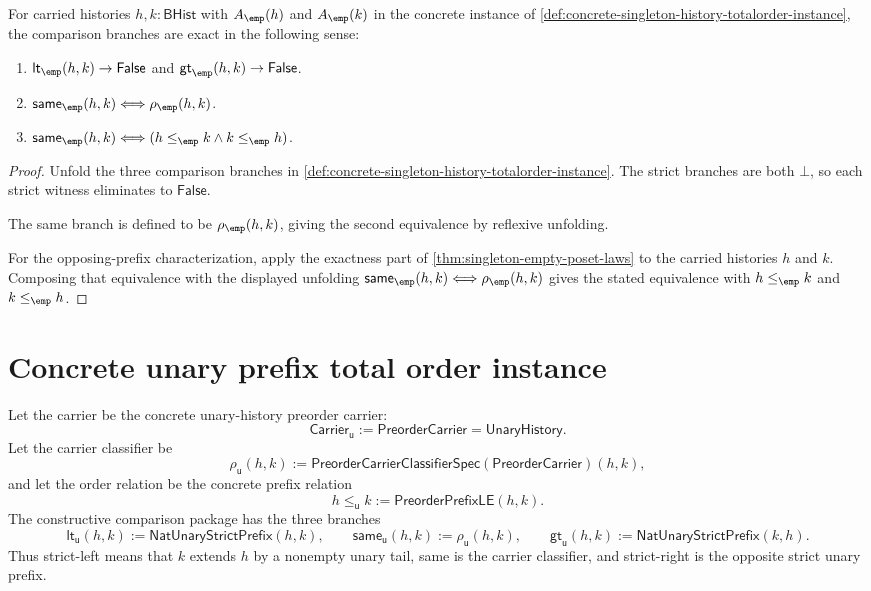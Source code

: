 \begin{theorem}
\label{thm:singleton-totalorder-comparison-exactness}
For carried histories $h,k:\mathsf{BHist}$ with $A_{\emp}(h)$ and
$A_{\emp}(k)$ in the concrete instance of
\autoref{def:concrete-singleton-history-totalorder-instance}, the comparison
branches are exact in the following sense:
\begin{enumerate}
  \item $\mathsf{lt}_{\emp}(h,k)\to\mathsf{False}$ and
  $\mathsf{gt}_{\emp}(h,k)\to\mathsf{False}$.
  \item $\mathsf{same}_{\emp}(h,k)\Longleftrightarrow\rho_{\emp}(h,k)$.
  \item $\mathsf{same}_{\emp}(h,k)\Longleftrightarrow
  (h\le_{\emp}k\land k\le_{\emp}h)$.
\end{enumerate}
\end{theorem}
\begin{proof}
Unfold the three comparison branches in
\autoref{def:concrete-singleton-history-totalorder-instance}. The strict
branches are both $\bot$, so each strict witness eliminates to
$\mathsf{False}$.

The same branch is defined to be $\rho_{\emp}(h,k)$, giving the second
equivalence by reflexive unfolding.

For the opposing-prefix characterization, apply the exactness part of
\autoref{thm:singleton-empty-poset-laws} to the carried histories $h$ and $k$.
Composing that equivalence with the displayed unfolding
$\mathsf{same}_{\emp}(h,k)\Longleftrightarrow\rho_{\emp}(h,k)$ gives the stated
equivalence with $h\le_{\emp}k$ and $k\le_{\emp}h$.
\end{proof}

\section{Concrete unary prefix total order instance}
\label{sec:totalorder-concrete-unary-prefix-instance}

\begin{definition}
\label{def:concrete-unary-prefix-totalorder-instance}
Let the carrier be the concrete unary-history preorder carrier:
$$
\mathsf{Carrier}_{\mathsf{u}}:=\mathsf{PreorderCarrier}
=\mathsf{UnaryHistory}.
$$
Let the carrier classifier be
$$
\rho_{\mathsf{u}}(h,k):=
\mathsf{PreorderCarrierClassifierSpec}(\mathsf{PreorderCarrier})(h,k),
$$
and let the order relation be the concrete prefix relation
$$
h\le_{\mathsf{u}}k:=\mathsf{PreorderPrefixLE}(h,k).
$$
The constructive comparison package has the three branches
$$
\mathsf{lt}_{\mathsf{u}}(h,k):=\mathsf{NatUnaryStrictPrefix}(h,k),
\qquad
\mathsf{same}_{\mathsf{u}}(h,k):=\rho_{\mathsf{u}}(h,k),
\qquad
\mathsf{gt}_{\mathsf{u}}(h,k):=\mathsf{NatUnaryStrictPrefix}(k,h).
$$
Thus strict-left means that $k$ extends $h$ by a nonempty unary tail, same is
the carrier classifier, and strict-right is the opposite strict unary prefix.
\end{definition}

